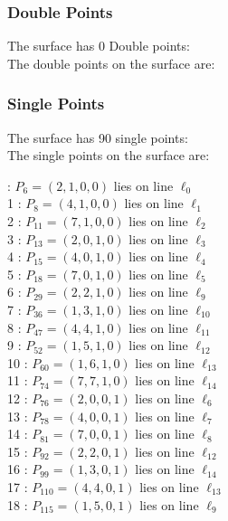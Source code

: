 \documentclass{article}
\begin{document}
{\subsubsection*{Double Points}
The surface has 0 Double points:\\
The double points on the surface are:\\
\begin{multicols}{2}
\noindent
\end{multicols}
\subsubsection*{Single Points}
The surface has 90 single points:\\
The single points on the surface are:\\
\begin{multicols}{2}
 : $P_{6}=( 2, 1, 0, 0 )$ lies on line $\ell_{0}$\\
1 : $P_{8}=( 4, 1, 0, 0 )$ lies on line $\ell_{1}$\\
2 : $P_{11}=( 7, 1, 0, 0 )$ lies on line $\ell_{2}$\\
3 : $P_{13}=( 2, 0, 1, 0 )$ lies on line $\ell_{3}$\\
4 : $P_{15}=( 4, 0, 1, 0 )$ lies on line $\ell_{4}$\\
5 : $P_{18}=( 7, 0, 1, 0 )$ lies on line $\ell_{5}$\\
6 : $P_{29}=( 2, 2, 1, 0 )$ lies on line $\ell_{9}$\\
7 : $P_{36}=( 1, 3, 1, 0 )$ lies on line $\ell_{10}$\\
8 : $P_{47}=( 4, 4, 1, 0 )$ lies on line $\ell_{11}$\\
9 : $P_{52}=( 1, 5, 1, 0 )$ lies on line $\ell_{12}$\\
10 : $P_{60}=( 1, 6, 1, 0 )$ lies on line $\ell_{13}$\\
11 : $P_{74}=( 7, 7, 1, 0 )$ lies on line $\ell_{14}$\\
12 : $P_{76}=( 2, 0, 0, 1 )$ lies on line $\ell_{6}$\\
13 : $P_{78}=( 4, 0, 0, 1 )$ lies on line $\ell_{7}$\\
14 : $P_{81}=( 7, 0, 0, 1 )$ lies on line $\ell_{8}$\\
15 : $P_{92}=( 2, 2, 0, 1 )$ lies on line $\ell_{12}$\\
16 : $P_{99}=( 1, 3, 0, 1 )$ lies on line $\ell_{14}$\\
17 : $P_{110}=( 4, 4, 0, 1 )$ lies on line $\ell_{13}$\\
18 : $P_{115}=( 1, 5, 0, 1 )$ lies on line $\ell_{9}$\\

\end{multicols}}
\end{document}
